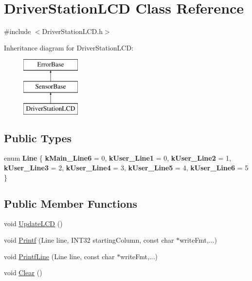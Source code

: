 \hypertarget{classDriverStationLCD}{\section{\-Driver\-Station\-L\-C\-D \-Class \-Reference}
\label{classDriverStationLCD}
}


{\ttfamily \#include $<$\-Driver\-Station\-L\-C\-D.\-h$>$}

\-Inheritance diagram for \-Driver\-Station\-L\-C\-D\-:\begin{figure}[H]
\begin{center}
\leavevmode
\includegraphics[height=3.000000cm]{classDriverStationLCD}
\end{center}
\end{figure}
\subsection*{\-Public \-Types}
\begin{DoxyCompactItemize}
\item 
enum {\bfseries \-Line} \{ \*
{\bfseries k\-Main\-\_\-\-Line6} = 0, 
{\bfseries k\-User\-\_\-\-Line1} = 0, 
{\bfseries k\-User\-\_\-\-Line2} = 1, 
{\bfseries k\-User\-\_\-\-Line3} = 2, 
\*
{\bfseries k\-User\-\_\-\-Line4} = 3, 
{\bfseries k\-User\-\_\-\-Line5} = 4, 
{\bfseries k\-User\-\_\-\-Line6} = 5
 \}
\end{DoxyCompactItemize}
\subsection*{\-Public \-Member \-Functions}
\begin{DoxyCompactItemize}
\item 
void \hyperlink{classDriverStationLCD_ac80467f0853ddf9cc1a82a927a366bde}{\-Update\-L\-C\-D} ()
\item 
void \hyperlink{classDriverStationLCD_a57e0628e1335e70050a7de3e9419df42}{\-Printf} (\-Line line, \-I\-N\-T32 starting\-Column, const char $\ast$write\-Fmt,...)
\item 
void \hyperlink{classDriverStationLCD_a369fcb21952476eac121c5d76f4eb5b1}{\-Printf\-Line} (\-Line line, const char $\ast$write\-Fmt,...)
\item 
void \hyperlink{classDriverStationLCD_a1d33a6a650592857f1ac605a87a5c0d5}{\-Clear} ()
\end{DoxyCompactItemize}
